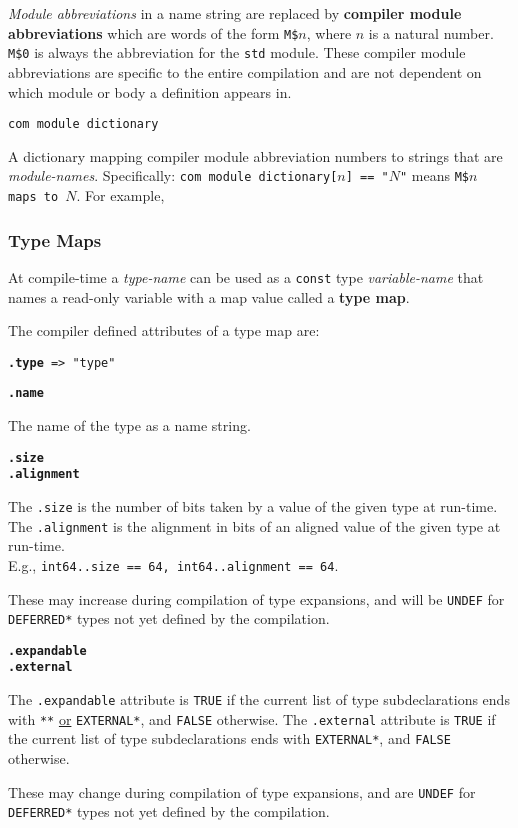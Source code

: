 \documentclass[12pt]{article}
\newcommand{\key}[1]{{\rm \bfseries #1}}
\newcommand{\ttkey}[1]{{\tt \bfseries #1}}
\newenvironment{indpar}[1][0.3in]%
	{\begin{list}{}%
		     {\setlength{\itemsep}{0in}%
		      \setlength{\topsep}{0in}%
		      \setlength{\parsep}{1ex}%
		      \setlength{\labelwidth}{#1}%
		      \setlength{\leftmargin}{#1}%
		      \addtolength{\leftmargin}{\labelsep}}%
	 \item}%
	{\end{list}}
\begin{document}
{\em Module abbreviations} in a name string are
replaced by \key{compiler module abbreviations}
which are words of the form {\tt M\$$n$}, where
$n$ is a natural number.  {\tt M\$0} is always
the abbreviation for the {\tt std} module.
These compiler module abbreviations are specific to the
entire compilation and are not dependent on which
module or body a definition appears in.

{\tt com module dictionary}
\begin{indpar}
A dictionary mapping compiler module abbreviation numbers
to strings that are {\em mod\-ule-names}.  Specifically:
{\tt com module dictionary[$n$] == "$N$"}
means {\tt M\$$n$ \rm{maps to} $N$}.
For example,
\\[0.5ex]
\hspace*{1.5in}{\tt com module dictionary[0] == "standard"}

\end{indpar}

\subsubsection{Type Maps}
\label{TYPE-MAPS}

At compile-time a {\em type-name} can be used as a {\tt const} type
{\em variable-name} that names a read-only variable with a map value
called a \key{type map}.

The compiler defined attributes of a type map are:

{\tt \ttkey{.type} => "type"}

\ttkey{.name}
\begin{indpar}
The name of the type as a name string.
\end{indpar}

\ttkey{.size} \\
\ttkey{.alignment}
\begin{indpar}
The {\tt .size} is the number of bits taken by a value of the given type at
run-time.
The {\tt .alignment} is the alignment in bits
of an aligned value of the given type at
run-time.
\\ E.g., {\tt int64..size == 64, int64..alignment == 64}.

These may increase during compilation of type expansions, and will be
{\tt UNDEF} for {\tt *DEFERRED*} types not yet defined by the
compilation.
\end{indpar}

\ttkey{.expandable} \\
\ttkey{.external}
\begin{indpar}
The {\tt .expandable} attribute is {\tt TRUE} if the
current list of type subdeclarations ends with
{\tt ***} \underline{or} {\tt *EXTERNAL*},
and {\tt FALSE} otherwise.
The {\tt .external} attribute is {\tt TRUE} if the current
list of type subdeclarations ends with
{\tt *EXTERNAL*}, and {\tt FALSE} otherwise.

These may change during compilation of type expansions, and are
{\tt UNDEF} for {\tt *DEFER\-RED*} types not yet defined by the
compilation.
\end{indpar}
\end{document}
